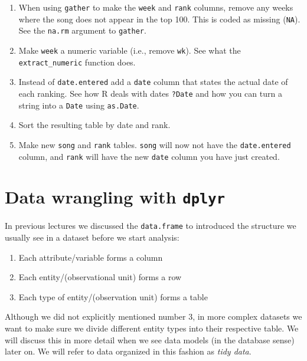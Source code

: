 \documentclass[12pt,]{book}
\providecommand{\tightlist}{%
  \setlength{\itemsep}{0pt}\setlength{\parskip}{0pt}}
\theoremstyle{definition}
\theoremstyle{definition}
\theoremstyle{definition}
\theoremstyle{remark}
\begin{document}
\begin{enumerate}
\def\labelenumi{\arabic{enumi}.}
\tightlist
\item
  When using \texttt{gather} to make the \texttt{week} and \texttt{rank}
  columns, remove any weeks where the song does not appear in the top
  100. This is coded as missing (\texttt{NA}). See the \texttt{na.rm}
  argument to \texttt{gather}.\\
\item
  Make \texttt{week} a numeric variable (i.e., remove \texttt{wk}). See
  what the \texttt{extract\_numeric} function does.\\
\item
  Instead of \texttt{date.entered} add a \texttt{date} column that
  states the actual date of each ranking. See how R deals with dates
  \texttt{?Date} and how you can turn a string into a \texttt{Date}
  using \texttt{as.Date}.\\
\item
  Sort the resulting table by date and rank.
\item
  Make new \texttt{song} and \texttt{rank} tables. \texttt{song} will
  now not have the \texttt{date.entered} column, and \texttt{rank} will
  have the new \texttt{date} column you have just created.
\end{enumerate}

\section{\texorpdfstring{Data wrangling with
\texttt{dplyr}}{Data wrangling with dplyr}}\label{data-wrangling-with-dplyr}

In previous lectures we discussed the \texttt{data.frame} to introduced
the structure we usually see in a dataset before we start analysis:

\begin{enumerate}
\def\labelenumi{\arabic{enumi}.}
\tightlist
\item
  Each attribute/variable forms a column
\item
  Each entity/(observational unit) forms a row
\item
  Each type of entity/(observation unit) forms a table
\end{enumerate}

Although we did not explicitly mentioned number 3, in more complex
datasets we want to make sure we divide different entity types into
their respective table. We will discuss this in more detail when we see
data models (in the database sense) later on. We will refer to data
organized in this fashion as \emph{tidy data}.
\end{document}
